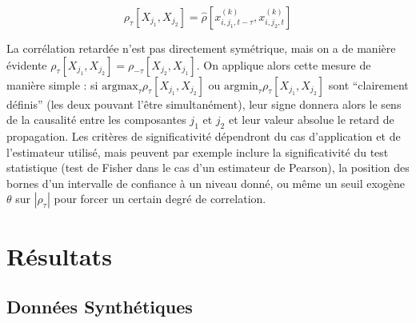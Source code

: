 \documentclass[french]{./sageo}
\begin{document}
\begin{equation}
\rho_{\tau}\left[X_{j_1},X_{j_2}\right] = \hat{\rho}\left[x^{(k)}_{i,j_1,t - \tau},x^{(k)}_{i,j_2,t}\right]
\end{equation}

La corrélation retardée n'est pas directement symétrique, mais on a de manière évidente $\rho_{\tau}\left[X_{j_1},X_{j_2}\right] = \rho_{-\tau}\left[X_{j_2},X_{j_1}\right]$. On applique alors cette mesure de manière simple : si $\textrm{argmax}_{\tau} \rho_{\tau}\left[X_{j_1},X_{j_2}\right]$ ou $\textrm{argmin}_{\tau} \rho_{\tau}\left[X_{j_1},X_{j_2}\right]$ sont ``clairement définis'' (les deux pouvant l'être simultanément), leur signe donnera alors le sens de la causalité entre les composantes $j_1$ et $j_2$ et leur valeur absolue le retard de propagation. Les critères de significativité dépendront du cas d'application et de l'estimateur utilisé, mais peuvent par exemple inclure la significativité du test statistique (test de Fisher dans le cas d'un estimateur de Pearson), la position des bornes d'un intervalle de confiance à un niveau donné, ou même un seuil exogène $\theta$ sur $\left|\rho_{\tau}\right|$ pour forcer un certain degré de correlation. 










\section{Résultats}


\subsection{Données Synthétiques}
\end{document}
